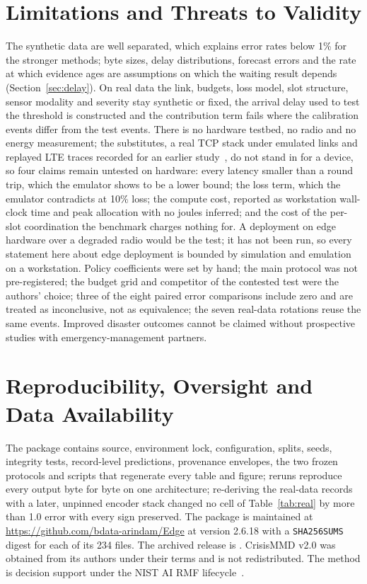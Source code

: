 \section{Limitations and Threats to Validity}
\label{sec:limits}
The synthetic data are well separated, which explains error rates below 1\% for the stronger methods; byte sizes, delay distributions, forecast errors and the rate at which evidence ages are assumptions on which the waiting result depends (Section~\ref{sec:delay}). On real data the link, budgets, loss model, slot structure, sensor modality and severity stay synthetic or fixed, the arrival delay used to test the threshold is constructed and the contribution term fails where the calibration events differ from the test events. There is no hardware testbed, no radio and no energy measurement; the substitutes, a real TCP stack under emulated links and replayed LTE traces recorded for an earlier study~\cite{sprout}, do not stand in for a device, so four claims remain untested on hardware: every latency smaller than a round trip, which the emulator shows to be a lower bound; the loss term, which the emulator contradicts at 10\% loss; the compute cost, reported as workstation wall-clock time and peak allocation with no joules inferred; and the cost of the per-slot coordination the benchmark charges nothing for. A deployment on edge hardware over a degraded radio would be the test; it has not been run, so every statement here about edge deployment is bounded by simulation and emulation on a workstation. Policy coefficients were set by hand; the main protocol was not pre-registered; the budget grid and competitor of the contested test were the authors' choice; three of the eight paired error comparisons include zero and are treated as inconclusive, not as equivalence; the seven real-data rotations reuse the same events. Improved disaster outcomes cannot be claimed without prospective studies with emergency-management partners.

\section{Reproducibility, Oversight and Data Availability}
The package contains source, environment lock, configuration, splits, seeds, integrity tests, record-level predictions, provenance envelopes, the two frozen protocols and scripts that regenerate every table and figure; reruns reproduce every output byte for byte on one architecture; re-deriving the real-data records with a later, unpinned encoder stack changed no cell of Table~\ref{tab:real} by more than 1.0 error with every sign preserved. The package is maintained at \url{https://github.com/bdata-arindam/Edge} at version 2.6.18 with a \texttt{SHA256SUMS} digest for each of its 234 files. {\edef\tmpdoi{\archivedoi}\ifx\tmpdoi\empty\else The archived release is \texttt{\archivedoi}. \fi} CrisisMMD v2.0 was obtained from its authors under their terms and is not redistributed. The method is decision support under the NIST AI RMF lifecycle~\cite{nistrmf}.

